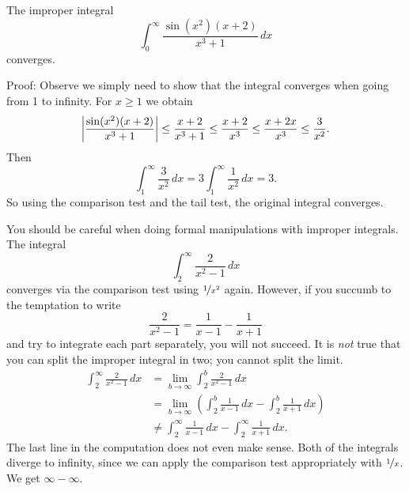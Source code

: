\begin{example}
The improper integral
\begin{equation*}
\int_0^\infty \frac{\sin(x^2)(x+2)}{x^3+1} \,dx
\end{equation*}
converges.

Proof:  Observe we simply need to show
that the integral converges when going from 1 to infinity.
For $x \geq 1$ we obtain
\begin{equation*}
\left\lvert {\frac{\sin(x^2)(x+2)}{x^3+1}} \right\rvert
\leq
\frac{x+2}{x^3+1}
\leq \frac{x+2}{x^3} \leq
\frac{x+2x}{x^3} \leq \frac{3}{x^2} .
\end{equation*}
Then
\begin{equation*}
\int_1^\infty \frac{3}{x^2}\,dx
=
3 \int_1^\infty \frac{1}{x^2}\,dx
=
3 .
\end{equation*}
So using the comparison test and the tail test, the original
integral converges.
\end{example}

\begin{example}
You should be careful when doing formal manipulations with improper
integrals.
The integral
\begin{equation*}
\int_2^\infty \frac{2}{x^2-1}\,dx
\end{equation*}
converges via the comparison test using $\nicefrac{1}{x^2}$ again.  However, if you
succumb to the temptation to write
\begin{equation*}
\frac{2}{x^2-1} = 
\frac{1}{x-1}
-
\frac{1}{x+1} 
\end{equation*}
and try to integrate each part separately, you will not succeed.
It is \emph{not} true that you can split the improper
integral in two; you cannot split the limit.
\begin{equation*}
\begin{split}
\int_2^\infty \frac{2}{x^2-1} \,dx &=
\lim_{b\to \infty} \int_2^b \frac{2}{x^2-1} \,dx
\\
&=
\lim_{b\to \infty}
\left(
\int_2^b \frac{1}{x-1}\,dx
-
\int_2^b \frac{1}{x+1}\,dx
\right)
\\
&\neq
\int_2^\infty \frac{1}{x-1}\,dx
-
\int_2^\infty \frac{1}{x+1}\,dx .
\end{split}
\end{equation*}
The last line in the computation does not even make sense.  Both of the
integrals diverge to infinity, since we can
apply the comparison test appropriately with
$\nicefrac{1}{x}$.  We get $\infty - \infty$.
\end{example}

